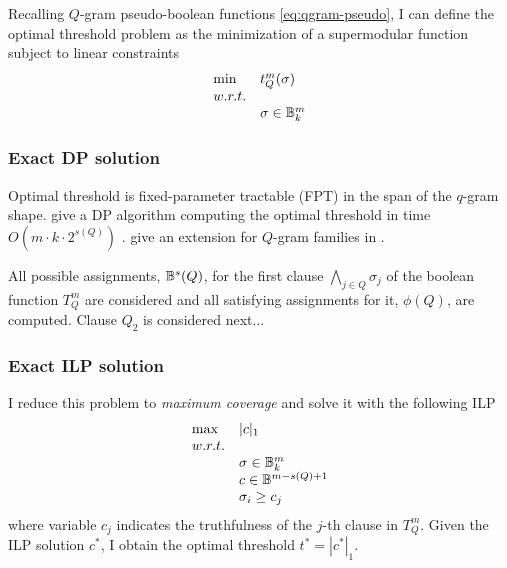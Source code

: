 Recalling $Q$-gram pseudo-boolean functions \ref{eq:qgram-pseudo}, I can define the optimal threshold problem as the minimization of a supermodular function subject to linear constraints
\begin{equation}
\begin{array}{ll}
\text{min} & t_{Q}^{m} (\sigma)			\\
w.r.t.								\\
& \sigma \in \mathbb {B}^m_k				\\
\end{array}
\end{equation}

\subsubsection{Exact DP solution}

Optimal threshold is fixed-parameter tractable (FPT) in the span of the $q$-gram shape.
\citeauthor{Burkhardt2001} give a DP algorithm computing the optimal threshold in time $O(m \cdot k \cdot 2^{s(Q)})$ \citep{Burkhardt2001}.
\citeauthor{Kucherov2005} give an extension for $Q$-gram families in \citep{Kucherov2005}.

All possible assignments, \ie $\mathbb {B}^s(Q)$, for the first clause $\bigwedge_{j \in Q}{\sigma_j}$ of the boolean function $T_{Q}^{m}$ are considered and all satisfying assignments for it, \ie $\phi(Q)$, are computed.
Clause $Q_2$ is considered next...

\subsubsection{Exact ILP solution}

I reduce this problem to \emph{maximum coverage} \citep{Vazirani2001} and solve it with the following ILP
\begin{equation}
\begin{array}{ll}
\text{max} & |c|_1					\\
w.r.t.							\\
& \sigma \in \mathbb {B}^m_k			\\
& c \in \mathbb {B}^{m - s(Q) + 1}		\\
& \sigma_i \geq c_j				\\
\end{array}
\end{equation}
where variable $c_j$ indicates the truthfulness of the $j$-th clause in $T_{Q}^{m}$. Given the ILP solution $c^*$, I obtain the optimal threshold $t^* = |c^*|_1$.

